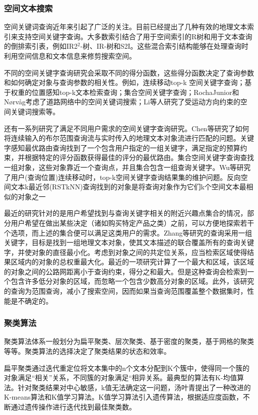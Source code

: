 \subsubsection{空间文本搜索}
空间关键词查询近年来引起了广泛的关注。目前已经提出了几种有效的地理文本索引来支持空间关键字查询。大多数索引结合了用于空间索引的R树和用于文本查询的倒排索引表，例如IR2$^2$-树、IR-树和S2I。这些混合索引结构能够在处理查询时利用空间信息和文本信息来修剪搜索空间。

不同的空间关键字查询研究会采取不同的得分函数，这些得分函数决定了查询参数和如何确定对象与查询参数的相关性。例如，连续移动top-k 空间关键字查询；基于权重的位置感知top-k文本检索查询；集合空间关键字查询；RochaJunior和Nørvåg考虑了道路网络中的空间关键词搜索；Li等人研究了受运动方向约束的空间关键词搜索等。

还有一系列研究了满足不同用户需求的空间关键字查询研究。Chen等研究了如何将连续输入的布尔范围查询流与实时传入的地理文本对象流进行匹配的问题。关键字感知最优路由查询找到了一个包含用户指定的一组关键字，满足指定的预算约束，并根据特定的评分函数获得最佳的评分的最优路由。集合空间关键字查询查找一组对象，这些对象靠近一个查询点，并且集合包含一组查询关键字。Wu等研究了用户(查询位置)连续移动时，top-k空间关键字查询结果集的维护问题。反向空间文本k最近邻(RSTkNN)查询找到的对象是将查询对象作为它们k个空间文本最相似的对象之一

最近的研究针对的是用户希望找到与查询关键字相关的附近兴趣点集合的情况，部分用户希望在做出某些决定（诸如购买特定产品之类）之前，可以方便地探索若干个选项，而上述的集合便可以满足这类用户的需求。Zhang等研究的查询采用一组关键字，目标是找到一组地理文本对象，使其文本描述的联合覆盖所有的查询关键字，并使对象的直径最小化。考虑到对象之间的共定位关系，应当检索区域使得结果区域内的对象的总权重最大化。最近的一项研究计算了一个最大和区域，该区域的对象之间的公路网距离小于查询约束，得分之和最大。但是这种查询会检索到一个包含许多低分对象的区域，而忽略一个包含少数高分对象的区域。此外，该研究的查询为范围查询，减小了搜索空间，因而如果当查询范围覆盖整个数据集时，性能是不确定的。

\subsubsection{聚类算法}
聚类算法体系一般划分为扁平聚类、层次聚类、基于密度的聚类，基于网格的聚类等等。聚类算法的选择决定了聚类结果的状态和效率。

扁平聚类通过迭代重定位将文本集中的n个文本分配到K个簇中，使得同一个簇的对象满足“相关”关系，不同簇的对象满足“相异关系。最典型的算法有K-均值算法。针对聚类结果对中心敏感，k值无法确定这一问题，汤叶青提出了一种改进的K-means算法和K值学习算法。K值学习算法引入遗传算法，根据适应度函数，不断通过遗传操作进行迭代找到最佳聚类数。

